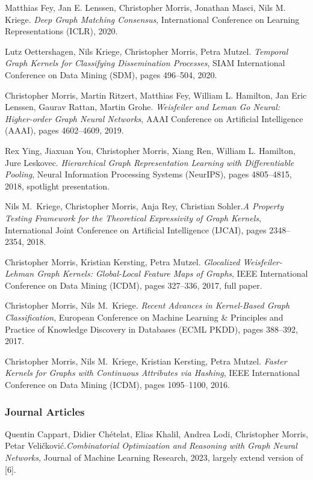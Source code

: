 \documentclass[11pt, a4paper, DIV=12]{scrartcl}
\begin{document}
\begin{thebibliography}{15}
	Matthias Fey, Jan E. Lenssen, Christopher Morris, Jonathan Masci, Nils M. Kriege.
	\emph{Deep Graph Matching Consensus},
	International Conference on Learning Representations (ICLR), 2020.

	Lutz Oettershagen, Nils Kriege, Christopher Morris, Petra Mutzel.
	\emph{Temporal Graph Kernels for Classifying Dissemination Processes},
	SIAM International Conference on Data Mining (SDM), pages 496--504, 2020.

	Christopher Morris, Martin Ritzert, Matthias Fey, William L. Hamilton, Jan Eric Lenssen, Gaurav Rattan, Martin Grohe.
	\newblock \emph{Weisfeiler and Leman Go Neural: Higher-order Graph Neural Networks},
	\newblock AAAI Conference on Artificial Intelligence (AAAI), pages 4602--4609, 2019.

	Rex Ying, Jiaxuan You, Christopher Morris, Xiang Ren, William L. Hamilton, Jure Leskovec.
	\emph{Hierarchical Graph Representation Learning with Differentiable Pooling},
	Neural Information Processing Systems (NeurIPS), pages 4805--4815, 2018, spotlight presentation.

	Nils M.~Kriege, Christopher Morris, Anja Rey, Christian Sohler.\footnotemark[2]
	\emph{A Property Testing Framework for the Theoretical Expressivity of Graph Kernels},
	International Joint Conference on Artificial Intelligence (IJCAI), pages 2348--2354, 2018.

	Christopher Morris, Kristian Kersting, Petra Mutzel.
	\emph{Glocalized Weisfeiler-Lehman Graph Kernels: Global-Local Feature Maps of Graphs},
	IEEE International Conference on Data Mining (ICDM), pages 327--336, 2017, full paper.

	Christopher Morris, Nils M.~Kriege.
	\emph{Recent Advances in Kernel-Based Graph Classification},
	European Conference on Machine Learning \& Principles and Practice of Knowledge Discovery in Databases (ECML PKDD), pages 388--392, 2017.

	Christopher Morris, Nils M.~Kriege, Kristian Kersting, Petra Mutzel.
	\emph{Faster Kernels for Graphs with Continuous Attributes via Hashing},
	IEEE International Conference on Data Mining (ICDM), pages 1095--1100, 2016.
	\subsubsection*{Journal Articles}

	Quentin Cappart, Didier Chételat, Elias Khalil, Andrea Lodi, Christopher Morris, Petar Veli\v{c}kovi\'{c}.\footnotemark[2]
	\emph{Combinatorial Optimization and Reasoning with Graph Neural Networks},
	Journal of Machine Learning Research, 2023, largely extend version of [6].


\end{thebibliography}
\end{document}
